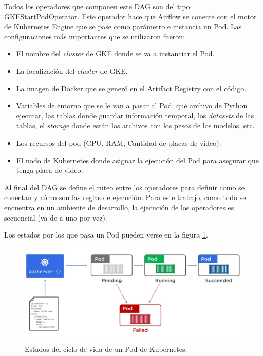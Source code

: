 Todos los operadores que componen este DAG son del tipo GKEStartPodOperator. Este operador hace que Airflow se conecte con el motor de Kubernetes Engine que se pase como parámetro e instancia un Pod. Las configuraciones más importantes que se utilizaron fueron:
\begin{itemize}
	\item El nombre del \textit{cluster} de GKE donde se va a instanciar el Pod.
	\item La localización del \textit{cluster} de GKE.
	\item La imagen de Docker que se generó en el Artifact Registry con el código.
	\item Variables de entorno que se le van a pasar al Pod: qué archivo de Python ejecutar, las tablas donde guardar información temporal, los \textit{datasets} de las tablas, el \textit{storage} donde están los archivos con los pesos de los modelos, etc.
	\item Los recursos del pod (CPU, RAM, Cantidad de placas de video).
	\item El nodo de Kubernetes donde asignar la ejecución del Pod para asegurar que tenga placa de video.
\end{itemize}

Al final del DAG se define el ruteo entre los operadores para definir como se conectan y cómo son las reglas de ejecución. Para este trabajo, como todo se encuentra en un ambiente de desarrollo, la ejecución de los operadores es secuencial (va de a uno por vez).

Los estados por los que pasa un Pod pueden verse en la figura \ref{fig:cap3-pod-lc}.

\begin{figure}[htbp]
	\centering
	\includegraphics[width=.8\textwidth]{./Figures/pod-lifecycle.jpeg}
	\caption{Estados del ciclo de vida de un Pod de Kubernetes\protect\footnotemark.}
	\label{fig:cap3-pod-lc}
\end{figure}


